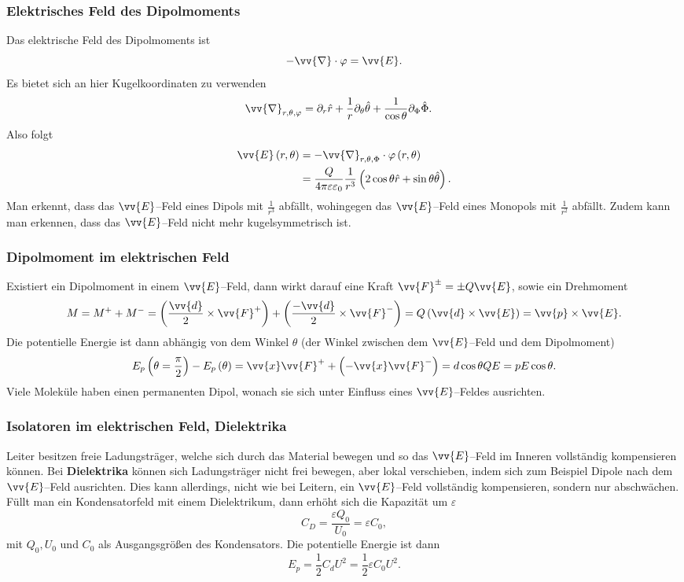 \documentclass[a4paper,12pt]{article}
\begin{document}
\subsubsection{Elektrisches Feld des Dipolmoments}
Das elektrische Feld des Dipolmoments ist
\[ 
        -\vv{\nabla }\cdot \varphi =\vv{E}
.\] 
Es bietet sich an hier Kugelkoordinaten zu verwenden
\begin{align*}
        \vv{\nabla }_{r,\theta ,\varphi }&=\partial_r \hat{r}+\dfrac{1}{r}\partial_\theta \hat{\theta }+\dfrac{1}{\cos \theta }\partial_\Phi \hat{\Phi }
.\end{align*}
Also folgt
\begin{align*}
        \vv{E}\left(r,\theta \right)&=-\vv{\nabla }_{r,\theta ,\Phi }\cdot \varphi \left(r,\theta \right)\\
                                    &=\dfrac{Q}{4\pi \varepsilon \varepsilon _0}\dfrac{1}{r^3}\left(2\cos \theta \hat{r}+\sin \theta \hat{\theta }\right)
.\end{align*}
Man erkennt, dass das $\vv{E}$--Feld eines Dipols mit $\tfrac{1}{r^3}$ abfällt, wohingegen das $\vv{E}$--Feld eines Monopols mit $\tfrac{1}{r^2}$ abfällt. Zudem kann man erkennen, dass das $\vv{E}$--Feld nicht mehr kugelsymmetrisch ist.

\subsubsection{Dipolmoment im elektrischen Feld}
Existiert ein Dipolmoment in einem $\vv{E}$--Feld, dann wirkt darauf eine Kraft $\vv{F}^{\pm}=\pm Q\vv{E}$, sowie ein Drehmoment
\[ 
        M=M^++M^-=\left(\dfrac{\vv{d}}{2}\times \vv{F}^+\right)+\left(\dfrac{-\vv{d}}{2}\times \vv{F}^-\right)=Q\left(\vv{d}\times \vv{E}\right)=\vv{p}\times \vv{E}
.\] 
Die potentielle Energie ist dann abhängig von dem Winkel $\theta $ (der Winkel zwischen dem $\vv{E}$--Feld und dem Dipolmoment)
\[ 
        E_p\left(\theta =\dfrac{\pi }{2}\right)-E_p\left(\theta \right)=\vv{x}\vv{F}^++\left(-\vv{x}\vv{F}^-\right)=d\cos \theta QE=pE\cos \theta 
.\] 
Viele Moleküle haben einen permanenten Dipol, wonach sie sich unter Einfluss eines $\vv{E}$--Feldes ausrichten.

\subsubsection{Isolatoren im elektrischen Feld, Dielektrika}
Leiter besitzen freie Ladungsträger, welche sich durch das Material bewegen und so das $\vv{E}$--Feld im Inneren vollständig kompensieren können. Bei \textbf{Dielektrika} können sich Ladungsträger nicht frei bewegen, aber lokal verschieben, indem sich zum Beispiel Dipole nach dem $\vv{E}$--Feld ausrichten. Dies kann allerdings, nicht wie bei Leitern, ein $\vv{E}$--Feld vollständig kompensieren, sondern nur abschwächen.\\\indent
Füllt man ein Kondensatorfeld mit einem Dielektrikum, dann erhöht sich die Kapazität um $\varepsilon $ 
\[ 
        C_D=\dfrac{\varepsilon Q_0}{U_0}=\varepsilon C_0
,\] 
mit $Q_0,U_0$ und $C_0$ als Ausgangsgrößen des Kondensators. Die potentielle Energie ist dann
\[ 
        E_p=\dfrac{1}{2}C_dU^2=\dfrac{1}{2}\varepsilon C_0U^2
.\] 
\end{document}
